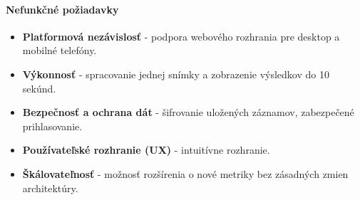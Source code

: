 \paragraph{Nefunkčné požiadavky}
\begin{itemize}
  \item \textbf{Platformová nezávislosť} - podpora webového rozhrania pre desktop a mobilné telefóny.
  \item \textbf{Výkonnosť} - spracovanie jednej snímky a zobrazenie výsledkov do 10 sekúnd.
  \item \textbf{Bezpečnosť a ochrana dát} - šifrovanie uložených záznamov, zabezpečené prihlasovanie.
  \item \textbf{Používateľské rozhranie (UX)} - intuitívne rozhranie.
  \item \textbf{Škálovateľnosť} - možnosť rozšírenia o nové metriky bez zásadných zmien architektúry.
\end{itemize}


\iffalse
